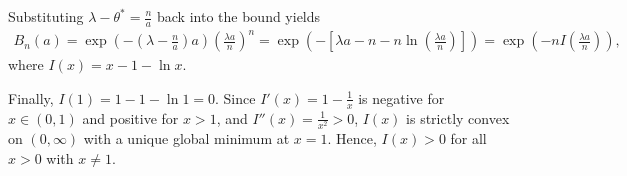 \documentclass{article}
\begin{document}
Substituting $\lambda - \theta^* = \frac{n}{a}$ back into the bound yields
\begin{align*}
B_n(a) = \exp\left( -\left(\lambda - \frac{n}{a}\right)a \right) \left( \frac{\lambda a}{n} \right)^n 
= \exp\left( -\left[ \lambda a - n - n \ln\left(\frac{\lambda a}{n}\right) \right] \right) 
= \exp\left( -n I\left(\frac{\lambda a}{n}\right) \right),
\end{align*}
where $I(x) = x - 1 - \ln x$. 

Finally, $I(1) = 1 - 1 - \ln 1 = 0$. Since $I'(x) = 1 - \frac{1}{x}$ is negative for $x \in (0,1)$ and positive for $x > 1$, and $I''(x) = \frac{1}{x^2} > 0$, $I(x)$ is strictly convex on $(0, \infty)$ with a unique global minimum at $x = 1$. Hence, $I(x) > 0$ for all $x > 0$ with $x \neq 1$.
\end{document}
